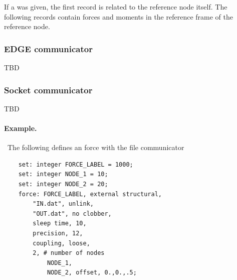 If a  was given, the first record is related
to the reference node itself.
The following records contain forces and moments in the reference frame
of the reference node.



\subsubsection{EDGE communicator}
TBD




\subsubsection{Socket communicator}
TBD




\paragraph{Example.} \
The following defines an  force
with the file communicator
\begin{verbatim}
    set: integer FORCE_LABEL = 1000;
    set: integer NODE_1 = 10;
    set: integer NODE_2 = 20;
    force: FORCE_LABEL, external structural,
        "IN.dat", unlink,
        "OUT.dat", no clobber,
        sleep time, 10,
        precision, 12,
        coupling, loose,
        2, # number of nodes
            NODE_1,
            NODE_2, offset, 0.,0.,.5;
\end{verbatim}

